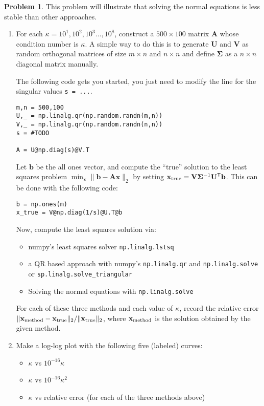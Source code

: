 \documentclass[12pt]{article}
\theoremstyle{definition}
\newtheorem{problem}{Problem}
\renewcommand{\vec}{\mathbf}
\newcommand{\T}{\mathsf{T}}
\begin{document}
\begin{problem}

This problem will illustrate that solving the normal equations is less stable than other approaches.

\begin{enumerate}
    \item 
    For each $\kappa = 10^1,10^2,10^3 \ldots, 10^8$, construct a $500\times 100$ matrix $\vec{A}$ whose condition number is $\kappa$.
        A simple way to do this is to generate $\vec{U}$ and $\vec{V}$ as random orthogonal matrices of size $m\times n$ and $n\times n$ and define $\vec{\Sigma}$ as a $n\times n$ diagonal matrix manually.
    
The following code gets you started, you just need to modify the line for the singular values \lstinline{s = ...}.
\begin{lstlisting}
m,n = 500,100
U,_ = np.linalg.qr(np.random.randn(m,n))
V,_ = np.linalg.qr(np.random.randn(n,n))
s = #TODO
    
A = U@np.diag(s)@V.T
\end{lstlisting}


        Let $\vec{b}$ be the all ones vector, and compute the ``true'' solution to the least squares problem $\min_{\vec{x}} \| \vec{b} - \vec{A} \vec{x}\|_2$  by setting 
    $\vec{x}_{\textup{true}} =  \vec{V} \vec{\Sigma}^{-1} \vec{U}^\T \vec{b}$.
This can be done with the following code:
\begin{lstlisting}
b = np.ones(m)
x_true = V@np.diag(1/s)@U.T@b
\end{lstlisting}


Now, compute the least squares solution via:
\begin{itemize}
    \item numpy's least squares solver \lstinline{np.linalg.lstsq}
    \item a QR based approach with numpy's \lstinline{np.linalg.qr} and \lstinline{np.linalg.solve} or \lstinline{sp.linalg.solve_triangular}
    \item Solving the normal equations with \lstinline{np.linalg.solve}
\end{itemize}

    For each of these three methods and each value of $\kappa$, record the relative error $\| \vec{x}_{\textup{method}} - \vec{x}_{\textup{true}} \|_2 / \| \vec{x}_{\textup{true}} \|_2$, where $\vec{x}_{\textup{method}}$ is the solution obtained by the given method.

\item 
    Make a log-log plot with the following five (labeled) curves:
    \begin{itemize}
        \item $\kappa$ vs $10^{-16} \kappa$
        \item $\kappa$ vs $10^{-16} \kappa^2$
        \item $\kappa$ vs relative error (for each of the three methods above)
    \end{itemize}


\end{enumerate}
\end{problem}
\end{document}
